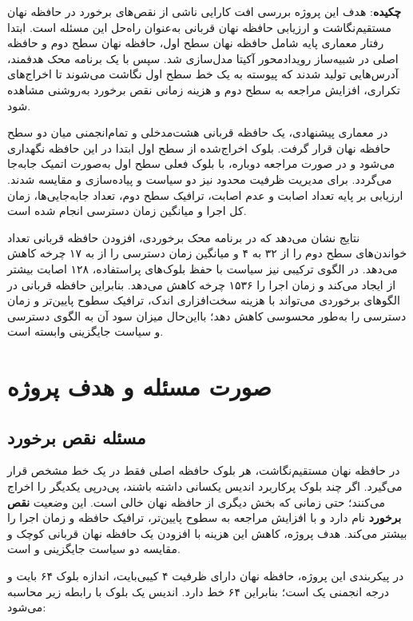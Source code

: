 \documentclass[oneside,a4paper,12pt]{article}
\newcommand{\مهم}[1]{\textbf{#1}}
\newcommand{\درصد}[1]{\lr{#1\%}}
\begin{document}
\noindent \مهم{چکیده}: هدف این پروژه بررسی افت کارایی ناشی از نقص‌های برخورد در حافظه نهان مستقیم‌نگاشت و ارزیابی حافظه نهان قربانی به‌عنوان راه‌حل این مسئله است. ابتدا رفتار معماری پایه شامل حافظه نهان سطح اول، حافظه نهان سطح دوم و حافظه اصلی در شبیه‌ساز رویدادمحور آکیتا مدل‌سازی شد. سپس با یک برنامه محک هدفمند، آدرس‌هایی تولید شدند که پیوسته به یک خط سطح اول نگاشت می‌شوند تا اخراج‌های تکراری، افزایش مراجعه به سطح دوم و هزینه زمانی نقص برخورد به‌روشنی مشاهده شود.

در معماری پیشنهادی، یک حافظه قربانی هشت‌مدخلی و تمام‌انجمنی میان دو سطح حافظه نهان قرار گرفت. بلوک اخراج‌شده از سطح اول ابتدا در این حافظه نگهداری می‌شود و در صورت مراجعه دوباره، با بلوک فعلی سطح اول به‌صورت اتمیک جابه‌جا می‌گردد. برای مدیریت ظرفیت محدود نیز دو سیاست  و  پیاده‌سازی و مقایسه شدند. ارزیابی بر پایه تعداد اصابت و عدم اصابت، ترافیک سطح دوم، تعداد جابه‌جایی‌ها، زمان کل اجرا و میانگین زمان دسترسی انجام شده است.

نتایج نشان می‌دهد که در برنامه محک برخوردی، افزودن حافظه قربانی تعداد خواندن‌های سطح دوم را از ۳۲ به ۴ و میانگین زمان دسترسی را از  به ۱۷ چرخه کاهش می‌دهد. در الگوی ترکیبی نیز سیاست  با حفظ بلوک‌های پراستفاده، ۱۲۸ اصابت بیشتر از  ایجاد می‌کند و زمان اجرا را ۱۵۳۶ چرخه کاهش می‌دهد. بنابراین حافظه قربانی در الگوهای برخوردی می‌تواند با هزینه سخت‌افزاری اندک، ترافیک سطوح پایین‌تر و زمان دسترسی را به‌طور محسوسی کاهش دهد؛ بااین‌حال میزان سود آن به الگوی دسترسی و سیاست جایگزینی وابسته است.

\section{صورت مسئله و هدف پروژه}

\subsection{مسئله نقص برخورد}

در حافظه نهان مستقیم‌نگاشت، هر بلوک حافظه اصلی فقط در یک خط مشخص قرار می‌گیرد. اگر چند بلوک پرکاربرد اندیس یکسانی داشته باشند، پی‌درپی یکدیگر را اخراج می‌کنند؛ حتی زمانی که بخش دیگری از حافظه نهان خالی است. این وضعیت \مهم{نقص برخورد} نام دارد و با افزایش مراجعه به سطوح پایین‌تر، ترافیک حافظه و زمان اجرا را بیشتر می‌کند. هدف پروژه، کاهش این هزینه با افزودن یک حافظه نهان قربانی کوچک و مقایسه دو سیاست جایگزینی  و  است.

در پیکربندی این پروژه، حافظه نهان  دارای ظرفیت ۴ کیبی‌بایت، اندازه بلوک ۶۴ بایت و درجه انجمنی یک است؛ بنابراین ۶۴ خط دارد. اندیس یک بلوک با رابطه زیر محاسبه می‌شود:
\end{document}
